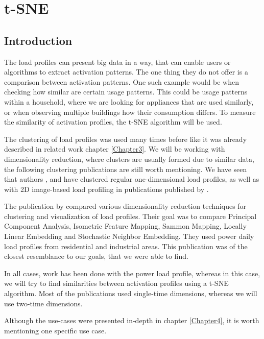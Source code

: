\chapter{t-SNE} 

\label{Chapter8} 

\section{Introduction}

The load profiles can present big data in a way, that can enable users or algorithms to extract activation patterns.
The one thing they do not offer is a comparison between activation patterns.
One such example would be when checking how similar are certain usage patterns.
This could be usage patterns within a household, where we are looking for appliances that are used similarly,
or when observing multiple buildings how their consumption differs. 
To measure the similarity of activation profiles, the t-SNE algorithm will be used.

The clustering of load profiles was used many times before like it was already described in related work chapter \ref{Chapter3}.
We will be working with dimensionality reduction, where clusters are usually formed due to similar data, the following clustering publications are still worth mentioning.
We have seen that authors \cite{GERBEC2005}, \cite{Jeong2021} and \cite{Joana2012} have clustered regular one-dimensional load profiles, as well as with 2D image-based load profiling in publications published by \cite{Park2019}. 

The publication by \cite{sne_energ} compared various dimensionality reduction techniques for clustering and visualization of load profiles.
Their goal was to compare Principal Component Analysis, Isometric Feature Mapping, Sammon Mapping, Locally Linear Embedding and Stochastic Neighbor Embedding.
They used power daily load profiles from residential and industrial areas.
This publication was of the closest resemblance to our goals, that we were able to find. 

In all cases, work has been done with the power load profile, whereas in this case, we will try to find similarities between activation profiles using a t-SNE algorithm.
Most of the publications used single-time dimensions, whereas we will use two-time dimensions.

Although the use-cases were presented in-depth in chapter \ref{Chapter4}, it is worth mentioning one specific use case.

